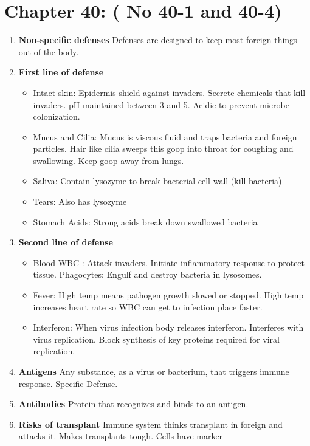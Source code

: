 \documentclass[9pt]{article}
\begin{document}
\section*{Chapter 40: ( No 40-1 and 40-4)}
\begin{enumerate}
  \item {\bf Non-specific defenses}
    Defenses are designed to keep most foreign things out of the body.
  \item {\bf First line of defense}
  \begin{itemize}
    \item Intact skin: Epidermis shield against invaders. Secrete
      chemicals that kill invaders. pH maintained between 3 and
      5. Acidic to prevent microbe colonization.
    \item Mucus and Cilia: Mucus is viscous fluid and traps bacteria
      and foreign particles. Hair like cilia sweeps this goop into
      throat for coughing and swallowing. Keep goop away from lungs.
    \item Saliva: Contain lysozyme to break bacterial cell wall (kill
      bacteria)
    \item Tears: Also has lysozyme
    \item Stomach Acids: Strong acids break down swallowed bacteria
  \end{itemize}
  \item {\bf Second line of defense}
    \begin{itemize}
      \item Blood WBC : Attack invaders. Initiate inflammatory
        response to protect tissue. Phagocytes: Engulf and destroy
        bacteria in lysosomes.
      \item Fever: High temp means pathogen growth slowed or
        stopped. High temp increases heart rate so WBC can get to
        infection place faster.
      \item Interferon: When virus infection body releases
        interferon. Interferes with virus replication. Block synthesis
        of key proteins required for viral replication.
    \end{itemize}
  \item {\bf Antigens} Any substance, as a virus or bacterium, that
    triggers immune response. Specific Defense.
  \item {\bf Antibodies} Protein that recognizes and binds to an
    antigen.
  \item {\bf Risks of transplant} Immune system thinks transplant in
    foreign and attacks it. Makes transplants tough. Cells have marker

\end{enumerate}
\end{document}
